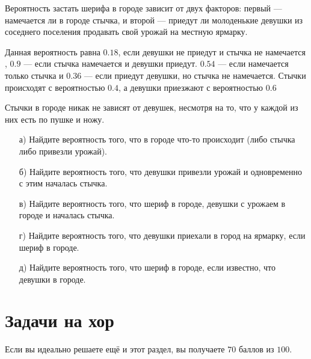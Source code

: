 \documentclass[12pt, a4paper, oneside]{article}
\begin{document}
\begin{problem}{10}
    Вероятность застать шерифа в городе зависит от двух факторов: первый — намечается ли в городе стычка, и второй — приедут ли молоденькие девушки из соседнего поселения продавать свой урожай на местную ярмарку. 

    Данная вероятность равна $0.18$, если девушки не приедут и стычка не намечается , $0.9$ — если стычка намечается и девушки приедут. $0.54$ — если намечается только стычка и $0.36$ — если приедут девушки, но стычка не намечается. Стычки происходят с вероятностью $0.4$, а девушки приезжают с вероятностью $0.6$

    Стычки в городе никак не зависят от девушек, несмотря на то, что у каждой из них есть по пушке и ножу.     
    \begin{enumerate} 
        \item[а)] Найдите вероятность того, что в городе что-то происходит (либо стычка либо привезли урожай).
        \item[б)] Найдите вероятность того, что девушки привезли урожай и одновременно с этим началась стычка.
        \item[в)] Найдите вероятность того, что шериф в городе, девушки с урожаем в городе и началась стычка. 
        \item[г)] Найдите вероятность того, что девушки приехали в город на ярмарку, если шериф в городе.
        \item[д)] Найдите вероятность того, что шериф в городе, если известно, что девушки в городе.
    \end{enumerate}
\end{problem}



\section*{Задачи на хор}

Если вы идеально решаете ещё и этот раздел, вы получаете $70$ баллов из $100$.
\end{document}
